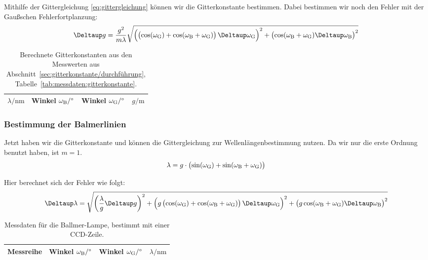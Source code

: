 Mithilfe der Gittergleichung \eqref{eq:gittergleichung} können wir die
Gitterkonstante bestimmen. Dabei bestimmen wir noch den Fehler mit der
Gaußschen Fehlerfortplanzung:
\[
    \Deltaup g
    = \frac{g^2}{m\lambda} \sqrt{
        \del{\del{\cos(\omegaG) + \cos(\omegaB +
        \omegaG)} \Deltaup \omegaG}^2
        +
        \del{\cos(\omegaB + \omegaG) \Deltaup \omegaB}^2
    }
\]

\begin{table}[htbp]
    \centering
    \begin{tabular}{SSS|S}
        {$\lambda / \si{\nano\meter}$} & {Winkel $\omegaB / \si\degree$}  & {Winkel
    $\omegaG / \si\degree$} & {$g / \si{\meter}$} \\
        \hline
    \end{tabular}
    \caption{%
        Berechnete Gitterkonstanten aus den Messwerten aus
        Abschnitt~\ref{sec:gitterkonstante/durchführung},
        Tabelle~\ref{tab:messdaten:gitterkonstante}.
    }
    \label{tab:gitterkonstanten}
\end{table}


\FloatBarrier
\subsubsection{Bestimmung der Balmerlinien}

Jetzt haben wir die Gitterkonstante und können die Gittergleichung zur
Wellenlängenbestimmung nutzen. Da wir nur die erste Ordnung benutzt haben, ist
$m = 1$.
\[
    \lambda =
    g \cdot \del{\sin(\omega_\text G) + \sin(\omega_\text B + \omega_\text G)}
\]

Hier berechnet sich der Fehler wie folgt:
\[
    \Deltaup \lambda
    =
    \sqrt{
        \del{\frac{\lambda}g \Deltaup g}^2
        +
        \del{g \del{\cos(\omegaG) + \cos(\omegaB + \omegaG)} \Deltaup
        \omegaG}^2
        +
        \del{g \cos(\omegaB + \omegaG) \Deltaup \omegaB}^2
    }
\]

\begin{table}[htbp]
    \centering
    \begin{tabular}{SSSS}
        {Messreihe} & {Winkel $\omegaB / \si\degree$}  & {Winkel $\omegaG /
    \si\degree$} & {$\lambda/\si{\nano\meter}$} \\
        \hline
    \end{tabular}
    \caption{%
        Messdaten für die Ballmer-Lampe, bestimmt mit einer CCD-Zeile.
    }
    \label{tab:messdaten:balmer-wellenlängen}
\end{table}

